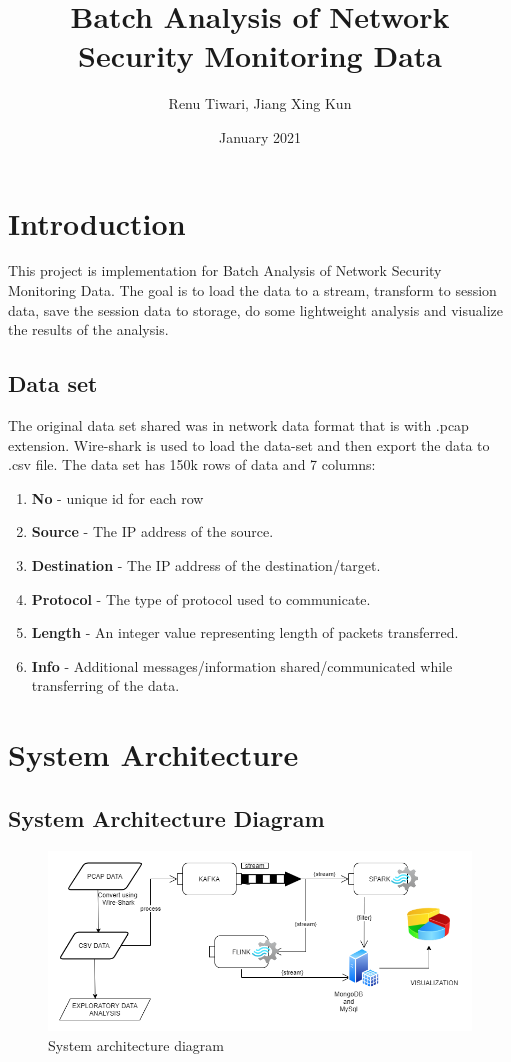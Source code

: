 \documentclass{article}
\title{Batch Analysis of Network Security Monitoring Data}
\author{Renu Tiwari, Jiang Xing Kun}
\date{January 2021}
\begin{document}
\maketitle

\section{Introduction}

This project is implementation for Batch Analysis of Network Security Monitoring Data. The goal is to load the data to a stream, transform to session data, save the session data to storage, do some lightweight analysis and visualize the results of the analysis.

\subsection{Data set}

The original data set shared was in network data format that is with .pcap extension. Wire-shark is used to load the data-set and then export the data to .csv file. The data set has 150k rows of data and 7 columns:
    \begin{enumerate}
    \item \textbf{No} - unique id for each row
    \item \textbf{Source} - The IP address of the source.
    \item \textbf{Destination} - The IP address of the destination/target.
    \item \textbf{Protocol} - The type of protocol used to communicate.
    \item \textbf{Length} - An integer value representing length of packets transferred.
    \item \textbf{Info} - Additional messages/information shared/communicated while transferring of the data.
    \end{enumerate}
   
\newpage
\section{System Architecture}
\subsection{System Architecture Diagram}

\begin{figure}[h!]
\centering
\includegraphics[scale=0.55]{Architecture.png}
\caption{System architecture diagram}
\label{fig:universe}
\end{figure}
 
\end{document}

